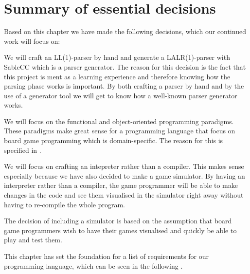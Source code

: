 \section{Summary of essential decisions}
\label{sec:summaryofdecisions}

Based on this chapter we have made the following decisions, which our
continued work will focus on:

We will craft an LL(1)-parser by hand and generate a LALR(1)-parser with SableCC
which is a parser generator. The reason for this decision is the fact that this
project is ment as a learning experience and therefore knowing how the parsing
phase works is important. By both crafting a parser by hand and by the use of a
generator tool we will get to know how a well-known parser generator works.

We will focus on the functional and object-oriented programming
paradigms. These paradigms make great sense for a programming language that
focus on board game programming which is domain-specific. The reason for this 
is specified in .

We will focus on crafting an intepreter rather than a compiler. This
makes sense especially because we have also decided to make a game simulator.
By having an interpreter rather than a compiler, the game programmer will be
able to make changes in the code and see them visualised in the simulator right
away without having to re-compile the whole program.

The decision of including a simulator is based on the assumption that board game
programmers wish to have their games visualised and quickly be able to play and
test them.

This chapter has set the foundation for a list of requirements for
our programming language, which can be seen in the following
.
